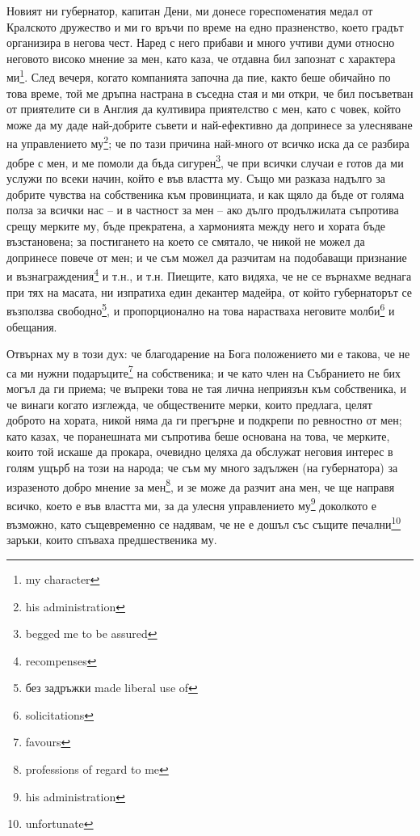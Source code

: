 \documentclass[12pt]{book}
\begin{document}
Новият ни губернатор, капитан Дени, ми донесе гореспоменатия медал от Кралското дружество и ми го връчи по време на едно празненство, което градът организира в негова чест. Наред с него прибави и много учтиви думи относно неговото високо мнение за мен, като каза, че отдавна бил запознат с характера ми\footnote{my character}. След вечеря, когато компанията започна да пие, както беше обичайно по това време, той ме дръпна настрана в съседна стая и ми откри, че бил посъветван от приятелите си в Англия да култивира приятелство с мен, като с човек, който може да му даде най-добрите съвети и най-ефективно да допринесе за улесняване на управлението му\footnote{his administration}; че по тази причина най-много от всичко иска да се разбира добре с мен, и ме помоли да бъда сигурен\footnote{begged me to be assured}, че при всички случаи е готов да ми услужи по всеки начин, който е във властта му. Също ми разказа надълго за добрите чувства на собственика към провинциата, и как щяло да бъде от голяма полза за всички нас – и в частност за мен – ако дълго продължилата съпротива срещу мерките му, бъде прекратена, а хармонията между него и хората бъде възстановена; за постигането на което се смятало, че никой не можел да допринесе повече от мен; и че съм можел да разчитам на подобаващи признание и възнаграждения\footnote{recompenses} и т.н., и т.н. Пиещите, като видяха, че не се върнахме веднага при тях на масата, ни изпратиха един декантер мадейра, от който губернаторът се възползва свободно\footnote{без задръжки made liberal use of}, и пропорционално на това нарастваха неговите молби\footnote{solicitations} и обещания.

Отвърнах му в този дух: че благодарение на Бога положението ми е такова, че не са ми нужни подаръците\footnote{favours} на собственика; и че като член на Събранието не бих могъл да ги приема; че въпреки това не тая лична неприязън към собственика, и че винаги когато изглежда, че обществените мерки, които предлага, целят доброто на хората, никой няма да ги прегърне и подкрепи по ревностно от мен; като казах, че поранешната  ми съпротива беше основана на това, че мерките, които той искаше да прокара, очевидно целяха да обслужат неговия интерес в голям ущърб на този на народа; че съм му много задължен (на губернатора) за изразеното добро мнение за мен\footnote{professions of regard to me}, и зе може да разчит ана мен, че ще направя всичко, което е във властта ми, за да улесня управлението му\footnote{his administration} доколкото е възможно, като същевременно се надявам, че не е дошъл със същите печални\footnote{unfortunate} заръки, които спъваха предшественика му.
\end{document}

